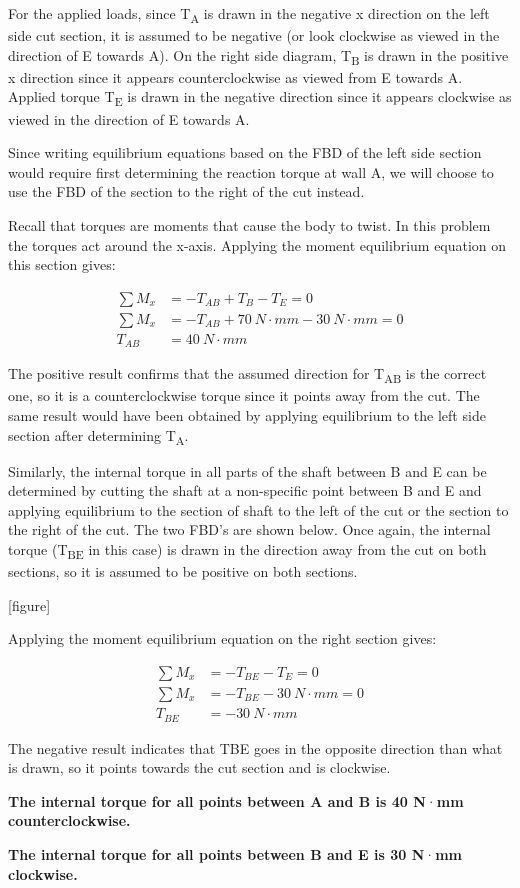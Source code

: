 \documentclass[
  letterpaper,
  DIV=11,
  numbers=noendperiod]{scrreprt}
\theoremstyle{definition}
\theoremstyle{remark}
\begin{document}
\begin{tcolorbox}
\begin{tcolorbox}
For the applied loads, since T\textsubscript{A} is drawn in the negative
x direction on the left side cut section, it is assumed to be negative
(or look clockwise as viewed in the direction of E towards A). On the
right side diagram, T\textsubscript{B} is drawn in the positive x
direction since it appears counterclockwise as viewed from E towards A.
Applied torque T\textsubscript{E} is drawn in the negative direction
since it appears clockwise as viewed in the direction of E towards A.

Since writing equilibrium equations based on the FBD of the left side
section would require first determining the reaction torque at wall A,
we will choose to use the FBD of the section to the right of the cut
instead.

Recall that torques are moments that cause the body to twist. In this
problem the torques act around the x-axis. Applying the moment
equilibrium equation on this section gives:

\[
\begin{aligned}
\sum M_x&=-T_{AB}+T_B-T_E=0 \\
\sum M_x&=-T_{A B}+70{~N}\cdot{mm}-30{~N}\cdot{mm}=0 \\
T_{A B}&=40{~N}\cdot{mm}
\end{aligned}
\]

The positive result confirms that the assumed direction for
T\textsubscript{AB} is the correct one, so it is a counterclockwise
torque since it points away from the cut. The same result would have
been obtained by applying equilibrium to the left side section after
determining T\textsubscript{A}.

Similarly, the internal torque in all parts of the shaft between B and E
can be determined by cutting the shaft at a non-specific point between B
and E and applying equilibrium to the section of shaft to the left of
the cut or the section to the right of the cut. The two FBD's are shown
below. Once again, the internal torque (T\textsubscript{BE} in this
case) is drawn in the direction away from the cut on both sections, so
it is assumed to be positive on both sections.

{[}figure{]}

Applying the moment equilibrium equation on the right section gives:

\[
\begin{aligned}
\sum M_x&=-T_{BE}-T_E=0 \\
\sum M_x&=-T_{BE}-30{~}N\cdot{mm}=0 \\
T_{B E}&=-30{~N}\cdot{mm}
\end{aligned}
\]

The negative result indicates that TBE goes in the opposite direction
than what is drawn, so it points towards the cut section and is
clockwise.

\textbf{The internal torque for all points between A and B is 40
N}·\textbf{mm counterclockwise.}

\textbf{The internal torque for all points between B and E is 30
N}·\textbf{mm clockwise.}

\end{tcolorbox}

\end{tcolorbox}
\end{document}
